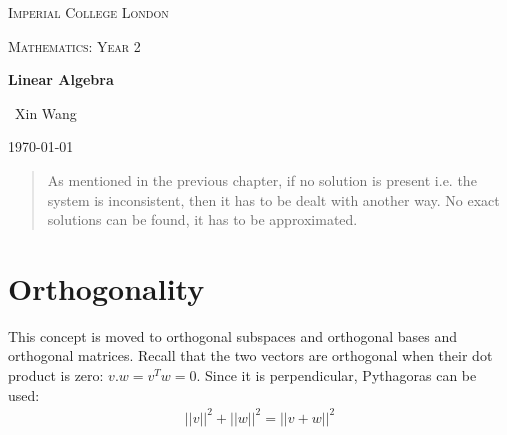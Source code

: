 \documentclass[10pt,a4paper]{article}
\begin{document}

\begin{titlepage}
	\centering
	{\scshape\LARGE Imperial College London \par}
	\vspace{1cm}
    {\scshape\Large Mathematics: Year 2\par}
    \vspace{1.5cm}
	{\huge\bfseries Linear Algebra \par}
	\vspace{2cm}
	{\Large\ Xin Wang }
	\vfill
	{\large \today\par}
\end{titlepage}


\begin{abstract}
    As mentioned in the previous chapter, if no solution is present i.e. the system is inconsistent,
    then it has to be dealt with another way. No exact solutions can be found, it has to be approximated.
\end{abstract}


\tableofcontents
\pagebreak

\section{Orthogonality}

This concept is moved to orthogonal subspaces and orthogonal bases and orthogonal matrices. Recall
that the two vectors are orthogonal when their dot product is zero:  $v . w = v^T w  =  0$. Since it
is perpendicular, Pythagoras can be used:
\begin{align*}
    ||v||^2 + ||w||^2 = ||v+w||^2
\end{align*}
\end{document}
